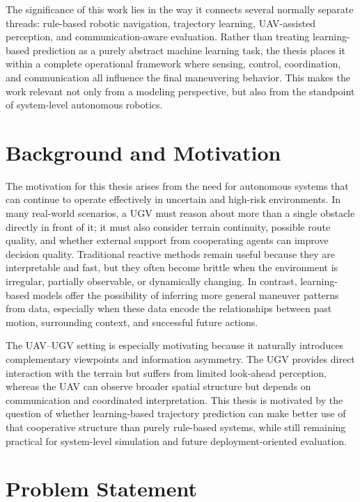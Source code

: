 The significance of this work lies in the way it connects several normally separate threads: rule-based robotic navigation, trajectory learning, UAV-assisted perception, and communication-aware evaluation. Rather than treating learning-based prediction as a purely abstract machine learning task, the thesis places it within a complete operational framework where sensing, control, coordination, and communication all influence the final maneuvering behavior. This makes the work relevant not only from a modeling perspective, but also from the standpoint of system-level autonomous robotics.

\section{Background and Motivation}

The motivation for this thesis arises from the need for autonomous systems that can continue to operate effectively in uncertain and high-risk environments. In many real-world scenarios, a UGV must reason about more than a single obstacle directly in front of it; it must also consider terrain continuity, possible route quality, and whether external support from cooperating agents can improve decision quality. Traditional reactive methods remain useful because they are interpretable and fast, but they often become brittle when the environment is irregular, partially observable, or dynamically changing. In contrast, learning-based models offer the possibility of inferring more general maneuver patterns from data, especially when these data encode the relationships between past motion, surrounding context, and successful future actions.

The UAV--UGV setting is especially motivating because it naturally introduces complementary viewpoints and information asymmetry. The UGV provides direct interaction with the terrain but suffers from limited look-ahead perception, whereas the UAV can observe broader spatial structure but depends on communication and coordinated interpretation. This thesis is motivated by the question of whether learning-based trajectory prediction can make better use of that cooperative structure than purely rule-based systems, while still remaining practical for system-level simulation and future deployment-oriented evaluation.

\section{Problem Statement}


